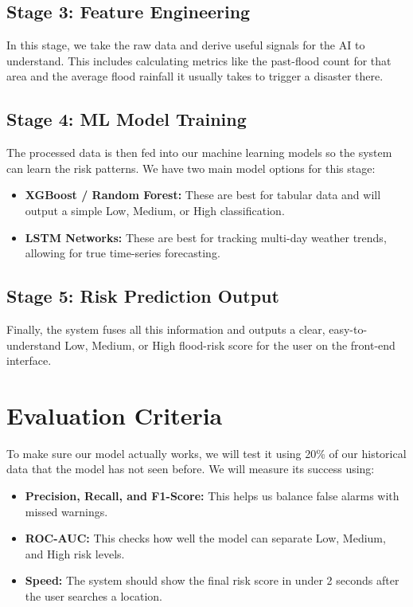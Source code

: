 \documentclass[11pt,a4paper]{article}
\begin{document}
\subsection{Stage 3: Feature Engineering}
In this stage, we take the raw data and derive useful signals for the AI to understand. This includes calculating metrics like the past-flood count for that area and the average flood rainfall it usually takes to trigger a disaster there.

\subsection{Stage 4: ML Model Training}
The processed data is then fed into our machine learning models so the system can learn the risk patterns. We have two main model options for this stage:
\begin{itemize}[noitemsep]
    \item \textbf{XGBoost / Random Forest:} These are best for tabular data and will output a simple Low, Medium, or High classification.
    \item \textbf{LSTM Networks:} These are best for tracking multi-day weather trends, allowing for true time-series forecasting.
\end{itemize}

\subsection{Stage 5: Risk Prediction Output}
Finally, the system fuses all this information and outputs a clear, easy-to-understand Low, Medium, or High flood-risk score for the user on the front-end interface.

\section{Evaluation Criteria}
To make sure our model actually works, we will test it using 20\% of our historical data that the model has not seen before. We will measure its success using:
\begin{itemize}[noitemsep]
    \item \textbf{Precision, Recall, and F1-Score:} This helps us balance false alarms with missed warnings.
    \item \textbf{ROC-AUC:} This checks how well the model can separate Low, Medium, and High risk levels.
    \item \textbf{Speed:} The system should show the final risk score in under 2 seconds after the user searches a location.
\end{itemize}
\end{document}
